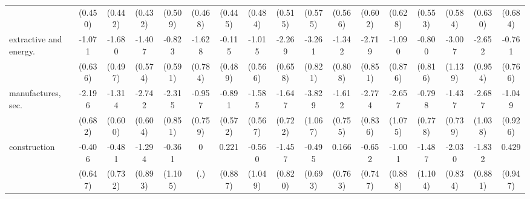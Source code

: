 {\begin{tabular}{l*{16}{c}}
                    &     (0.450)         &     (0.442)         &     (0.432)         &     (0.509)         &     (0.468)         &     (0.445)         &     (0.484)         &     (0.515)         &     (0.575)         &     (0.566)         &     (0.602)         &     (0.628)         &     (0.553)         &     (0.584)         &     (0.630)         &     (0.684)         \\
[1em]
extractive and energy.&      -1.071         &      -1.680\sym{***}&      -1.407\sym{*}  &      -0.823         &      -1.628\sym{*}  &      -0.115         &      -1.015         &      -2.269\sym{***}&      -3.261\sym{***}&      -1.342         &      -2.719\sym{**} &      -1.090         &      -0.800         &      -3.007\sym{**} &      -2.652\sym{**} &      -0.761         \\
                    &     (0.636)         &     (0.497)         &     (0.574)         &     (0.591)         &     (0.784)         &     (0.489)         &     (0.566)         &     (0.658)         &     (0.821)         &     (0.808)         &     (0.851)         &     (0.876)         &     (0.816)         &     (1.139)         &     (0.954)         &     (0.766)         \\
[1em]
manufactures, sec.  &      -2.196\sym{**} &      -1.314\sym{*}  &      -2.742\sym{***}&      -2.315\sym{**} &      -0.957         &      -0.891         &      -1.585\sym{**} &      -1.647\sym{*}  &      -3.829\sym{***}&      -1.612\sym{*}  &      -2.774\sym{***}&      -2.657\sym{*}  &      -0.798         &      -1.437         &      -2.687\sym{**} &      -1.049         \\
                    &     (0.682)         &     (0.600)         &     (0.604)         &     (0.851)         &     (0.759)         &     (0.572)         &     (0.567)         &     (0.722)         &     (1.067)         &     (0.755)         &     (0.836)         &     (1.075)         &     (0.778)         &     (0.739)         &     (1.038)         &     (0.926)         \\
[1em]
construction        &      -0.406         &      -0.481         &      -1.294         &      -0.361         &           0         &       0.221         &      -0.560         &      -1.457         &      -0.495         &       0.166         &      -0.652         &      -1.001         &      -1.487         &      -2.030\sym{*}  &      -1.832\sym{*}  &       0.429         \\
                    &     (0.647)         &     (0.732)         &     (0.893)         &     (1.105)         &         (.)         &     (0.887)         &     (1.049)         &     (0.820)         &     (0.693)         &     (0.763)         &     (0.747)         &     (0.888)         &     (1.104)         &     (0.834)         &     (0.881)         &     (0.947)         \\

\end{tabular}}

